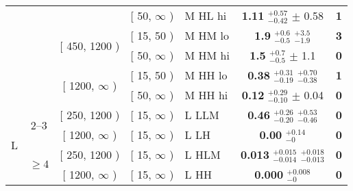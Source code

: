 \begin{table}[htbp]
\begin{tabular}{cccclcc}
& & & [ 50, $\infty$ ) & M HL hi & \textbf{1.11} $^{+0.57}_{-0.42}$ $\pm$ 0.58  & \textbf{1}\\ %

& & \multirow{2}{*}{[ 450, 1200 )} & [ 15, 50 ) & M HM lo & \textbf{1.9} $^{+0.6}_{-0.5}$ $^{+3.5}_{-1.9}$  & \textbf{3}\\ %

& & & [ 50, $\infty$ ) & M HM hi & \textbf{1.5} $^{+0.7}_{-0.5}$ $\pm$ 1.1  & \textbf{0}\\ %

& & \multirow{2}{*}{[ 1200, $\infty$ )} & [ 15, 50 ) & M HH lo & \textbf{0.38} $^{+0.31}_{-0.19}$ $^{+0.70}_{-0.38}$  & \textbf{1}\\ %

& & & [ 50, $\infty$ ) & M HH hi & \textbf{0.12} $^{+0.29}_{-0.10}$ $\pm$ 0.04  & \textbf{0}\\ %

\hline

\hline

\multirow{4}{*}{L} 

& \multirow{2}{*}{2--3} & [ 250, 1200 ) & [ 15, $\infty$ ) & L LLM  & \textbf{0.46} $^{+0.26}_{-0.20}$ $^{+0.53}_{-0.46}$  & \textbf{0}\\ %

&  & [ 1200, $\infty$ ) & [ 15, $\infty$ ) & L LH  & \textbf{0.00} $^{+0.14}_{-0}$  & \textbf{0}\\ %

& \multirow{2}{*}{$\geq 4$} & [ 250, 1200 ) & [ 15, $\infty$ ) & L HLM  & \textbf{0.013} $^{+0.015}_{-0.014}$ $^{+0.018}_{-0.013}$  & \textbf{0}\\ %

&  & [ 1200, $\infty$ ) & [ 15, $\infty$ ) & L HH  & \textbf{0.000} $^{+0.008}_{-0}$ & \textbf{0}\\ %

\hline

\end{tabular}

\end{table}



